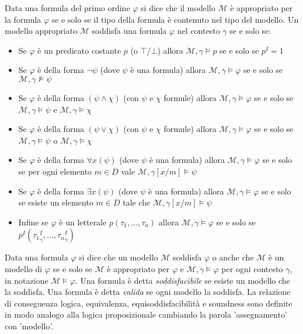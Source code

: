 \documentclass[./main.tex]{subfiles}
\begin{document}
Data una formula del primo ordine $\varphi$ si dice che il modello $\mathcal{M}$ è appropriato per la formula $\varphi$ se e solo se il tipo della formula è contenuto nel tipo del modello.
Un modello appropriato $\mathcal{M}$ soddisfa una formula $\varphi$ nel contesto $\gamma$ se e solo se:
\begin{itemize}
  \item Se $\varphi$ è un predicato costante $p$ (o $\top$/$\bot$) allora $\mathcal{M}, \gamma \models p$ se e solo se $p^I = 1$
  \item Se $\varphi$ è della forma $\lnot \psi$ (dove $\psi$ è una formula) allora $\mathcal{M}, \gamma \models \varphi$ se e solo se $\mathcal{M}, \gamma \not\models \psi$
  \item Se $\varphi$ è della forma $(\psi \land \chi)$ (con $\psi$ e $\chi$ formule) allora $\mathcal{M}, \gamma \models \varphi$ se e solo se $\mathcal{M}, \gamma \models \psi$ e $\mathcal{M}, \gamma \models \chi$
  \item Se $\varphi$ è della forma $(\psi \lor \chi)$ (con $\psi$ e $\chi$ formule) allora $\mathcal{M}, \gamma \models \varphi$ se e solo se $\mathcal{M}, \gamma \models \psi$ o $\mathcal{M}, \gamma \models \chi$
  \item Se $\varphi$ è della forma $\forall x (\psi)$ (dove $\psi$ è una formula) allora $\mathcal{M}, \gamma \models \varphi$
   se e solo se per ogni elemento $m \in D$ vale $\mathcal{M}, \gamma[x/m] \models \psi$
  \item Se $\varphi$ è della forma $\exists x (\psi)$ (dove $\psi$ è una formula) allora $\mathcal{M}, \gamma \models \varphi$ se e solo se
    esiste un elemento $m \in D$ tale che $\mathcal{M}, \gamma[x/m] \models \psi$
  \item Infine se $\varphi$ è un letterale $p(\tau_1, ..., \tau_n)$ allora $\mathcal{M}, \gamma \models \varphi$ se e solo se $p^I({\tau_1}^I_\gamma, ..., {\tau_n}^I_\gamma)$
\end{itemize}

Data una formula $\varphi$ si dice che un modello $\mathcal{M}$ soddisfa $\varphi$ o anche che $\mathcal{M}$ 
è un modello di $\varphi$ se e solo se $\mathcal{M}$ è appropriato per $\varphi$ e $\mathcal{M}, \gamma \models \varphi$ per ogni contesto $\gamma$,
in notazione $\mathcal{M} \models \varphi$. Una formula è detta \textit{soddisfacibile} se esiste un modello che la soddisfa.
Una formula è detta \textit{valida} se ogni modello la soddisfa.
La relazione di conseguenza logica, equivalenza, equisoddisfacibilità e soundness sono definite in modo analogo alla logica proposizionale
cambiando la parola 'assegnamento' con 'modello'.
\end{document}
